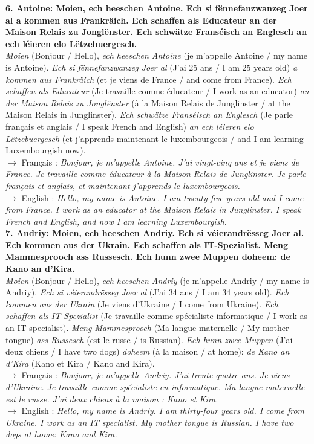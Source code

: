 \noindent\textbf{6. Antoine: Moien, ech heeschen Antoine. Ech si fënnefanzwanzeg Joer al a kommen aus Frankräich. Ech schaffen als Educateur an der Maison Relais zu Jonglënster. Ech schwätze Franséisch an Englesch an ech léieren elo Lëtzebuergesch.}\\
\textit{Moien} (Bonjour / Hello), \textit{ech heeschen Antoine} (je m'appelle Antoine / my name is Antoine). \textit{Ech si fënnefanzwanzeg Joer al} (J'ai 25 ans / I am 25 years old) \textit{a kommen aus Frankräich} (et je viens de France / and come from France). \textit{Ech schaffen als Educateur} (Je travaille comme éducateur / I work as an educator) \textit{an der Maison Relais zu Jonglënster} (à la Maison Relais de Junglinster / at the Maison Relais in Junglinster). \textit{Ech schwätze Franséisch an Englesch} (Je parle français et anglais / I speak French and English) \textit{an ech léieren elo Lëtzebuergesch} (et j'apprends maintenant le luxembourgeois / and I am learning Luxembourgish now).\\
$\rightarrow$ Français : \textit{Bonjour, je m'appelle Antoine. J'ai vingt-cinq ans et je viens de France. Je travaille comme éducateur à la Maison Relais de Junglinster. Je parle français et anglais, et maintenant j'apprends le luxembourgeois.}\\
$\rightarrow$ English : \textit{Hello, my name is Antoine. I am twenty-five years old and I come from France. I work as an educator at the Maison Relais in Junglinster. I speak French and English, and now I am learning Luxembourgish.}\\[0.5em]

\noindent\textbf{7. Andriy: Moien, ech heeschen Andriy. Ech si véierandrësseg Joer al. Ech kommen aus der Ukrain. Ech schaffen als IT-Spezialist. Meng Mammesprooch ass Russesch. Ech hunn zwee Muppen doheem: de Kano an d'Kira.}\\
\textit{Moien} (Bonjour / Hello), \textit{ech heeschen Andriy} (je m'appelle Andriy / my name is Andriy). \textit{Ech si véierandrësseg Joer al} (J'ai 34 ans / I am 34 years old). \textit{Ech kommen aus der Ukrain} (Je viens d'Ukraine / I come from Ukraine). \textit{Ech schaffen als IT-Spezialist} (Je travaille comme spécialiste informatique / I work as an IT specialist). \textit{Meng Mammesprooch} (Ma langue maternelle / My mother tongue) \textit{ass Russesch} (est le russe / is Russian). \textit{Ech hunn zwee Muppen} (J'ai deux chiens / I have two dogs) \textit{doheem} (à la maison / at home): \textit{de Kano an d'Kira} (Kano et Kira / Kano and Kira).\\
$\rightarrow$ Français : \textit{Bonjour, je m'appelle Andriy. J'ai trente-quatre ans. Je viens d'Ukraine. Je travaille comme spécialiste en informatique. Ma langue maternelle est le russe. J'ai deux chiens à la maison : Kano et Kira.}\\
$\rightarrow$ English : \textit{Hello, my name is Andriy. I am thirty-four years old. I come from Ukraine. I work as an IT specialist. My mother tongue is Russian. I have two dogs at home: Kano and Kira.}\\[0.5em]

